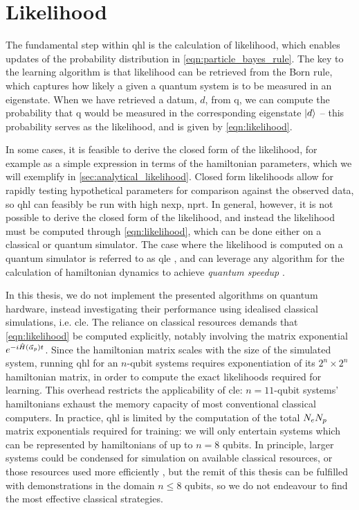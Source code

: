 \section{Likelihood}\label{sec:likelihood}
The fundamental step within \gls{qhl} is the calculation of  \gls{likelihood}, 
which enables updates of the probability distribution in \cref{eqn:particle_bayes_rule}. 
The key to the learning algorithm is that \gls{likelihood} can be retrieved from the Born rule, 
which captures how likely a given a quantum system is to be measured in an eigenstate.
When we have retrieved a datum, $d$, from \gls{q}, we can compute the probability that \gls{q} 
would be measured in the corresponding eigenstate $\ket{d}$ -- this probability serves as the likelihood, 
and is given by \cref{eqn:likelihood}.
\par 

In some cases, it is feasible to derive the closed form of the \gls{likelihood}, 
for example as a simple expression in terms of the \gls{hamiltonian} parameters, 
which we will exemplify in \cref{sec:analytical_likelihood}. 
Closed form likelihoods allow for rapidly testing hypothetical parameters for comparison against 
the observed data, so \gls{qhl} can feasibly be run with high \gls{nexp}, \gls{nprt}.  
In general, however, it is not possible to derive the closed form of the likelihood, 
and instead the \gls{likelihood} must be computed through \cref{eqn:likelihood}, 
which can be done either on a classical or quantum simulator. 
The case where the \gls{likelihood} is computed on a quantum simulator is referred to as \gls{qle}
\cite{Wiebe:2014qhl, wang2017experimental},
and can leverage any algorithm for the calculation of \gls{hamiltonian} dynamics to achieve \emph{quantum speedup}
\cite{lloyd1996universal, childs2018toward, berry2015hamiltonian}.
\par 
In this thesis, we do not implement the presented algorithms on quantum hardware,
instead investigating their performance using idealised classical simulations, i.e. \gls{cle}. 
The reliance on classical resources demands that \cref{eqn:likelihood} be computed explicitly, 
notably involving the matrix exponential $e^{-i\hat{H}(\vec{\alpha}_p) t}$.
Since the \gls{hamiltonian} matrix scales with the size of the simulated system,
running \gls{qhl} for an $n$-qubit systems requires exponentiation of its $2^n \times 2^n$ \gls{hamiltonian} matrix, 
in order to compute the exact likelihoods required for learning. 
This overhead restricts the applicability of \gls{cle}: 
$n=11$-qubit systems' \glspl{hamiltonian} exhaust the memory capacity of most conventional classical computers.
In practice, \gls{qhl} is limited by the computation of the total $N_eN_p$ matrix exponentials required for training:
we will only entertain systems which can be represented by \glspl{hamiltonian} of up to $n=8$ qubits. 
In principle, larger systems could be condensed for simulation on available classical resources, 
or those resources used more efficiently \cite{rudi2020approximating}, 
but the remit of this thesis can be fulfilled with demonstrations in the domain $n\leq8$ qubits, 
so we do not endeavour to find the most effective classical strategies.
\par 

